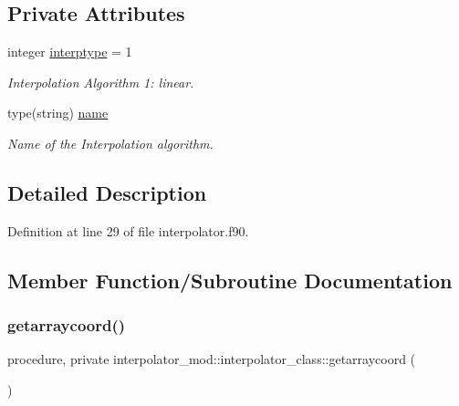 \subsection*{Private Attributes}
\begin{DoxyCompactItemize}
\item 
integer \mbox{\hyperlink{structinterpolator__mod_1_1interpolator__class_afdfac8b305fd660e113fcc4b2145a8da}{interptype}} = 1
\begin{DoxyCompactList}\small\item\em Interpolation Algorithm 1\+: linear. \end{DoxyCompactList}\item 
type(string) \mbox{\hyperlink{structinterpolator__mod_1_1interpolator__class_ac0d7be3d07fb72dec420461e031d6983}{name}}
\begin{DoxyCompactList}\small\item\em Name of the Interpolation algorithm. \end{DoxyCompactList}\end{DoxyCompactItemize}


\subsection{Detailed Description}


Definition at line 29 of file interpolator.\+f90.



\subsection{Member Function/\+Subroutine Documentation}
\mbox{\label{structinterpolator__mod_1_1interpolator__class_a63c210046b0aaacf729778f802335e3b}} 
\subsubsection{\texorpdfstring{getarraycoord()}{getarraycoord()}}
{\footnotesize\ttfamily procedure, private interpolator\+\_\+mod\+::interpolator\+\_\+class\+::getarraycoord (\begin{DoxyParamCaption}{ }\end{DoxyParamCaption})\hspace{0.3cm}{\ttfamily [private]}}



